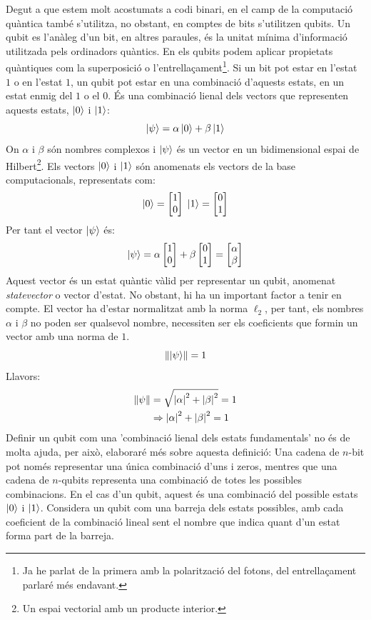 Degut a que estem molt acostumats a codi binari, en el camp de la computació quàntica també s'utilitza, no obstant, en comptes de bits s'utilitzen qubits. Un qubit es l'anàleg d'un bit, en altres paraules, és la unitat mínima d'informació utilitzada pels ordinadors quàntics. En els qubits podem aplicar propietats quàntiques com la superposició o l'entrellaçament\footnote{Ja he parlat de la primera amb la polarització del fotons, del entrellaçament parlaré més endavant.}. Si un bit pot estar en l'estat $1$ o en l'estat $1$, un qubit pot estar en una combinació d'aquests estats, en un estat enmig del $1$ o el $0$. És una combinació lienal dels vectors que representen aquests estats, $\ket{0}$ i $\ket{1}$:
$$
\ket{\psi} = \alpha\ket{0} + \beta\ket{1}
$$
On $\alpha$ i $\beta$ són nombres complexos i $\ket{\psi}$ és un vector en un bidimensional espai de Hilbert\footnote{Un espai vectorial amb un producte interior.}. Els vectors $\ket{0}$ i $\ket{1}$ són anomenats els vectors de la base computacionals, representats com:
$$
\ket{0} = \begin{bmatrix}
	1 \\ 0
\end{bmatrix} \;
\ket{1} = \begin{bmatrix}
	0 \\ 1
\end{bmatrix}
$$
Per tant el vector $\ket{\psi}$ és:
$$
\ket{\psi} 
= \alpha 
\begin{bmatrix}
	1 \\ 0
\end{bmatrix} + \beta 
\begin{bmatrix}
	0 \\ 1
\end{bmatrix}= 
\begin{bmatrix}
	\alpha \\ \beta
\end{bmatrix}
$$
Aquest vector és un estat quàntic vàlid per representar un qubit, anomenat \textit{statevector} o vector d'estat. No obstant, hi ha un important factor a tenir en compte. El vector ha d'estar normalitzat amb la norma $\ell_2$, per tant, els nombres $\alpha$ i $\beta$ no poden ser qualsevol nombre, necessiten ser els coeficients que formin un vector amb una norma de $1$.   
$$
\norm{\ket{\psi}} = 1 
$$
Llavors:
\begin{align*}
	\norm{\psi} &= \sqrt{\abs{\alpha}^2 + \abs{\beta}^2} = 1 \\
	&\Rightarrow \abs{\alpha}^2 + \abs{\beta}^2 = 1
\end{align*}
Definir un qubit com una 'combinació lienal dels estats fundamentals' no és de molta ajuda, per això, elaboraré més sobre aquesta definició: 
Una cadena de $n$-bit pot només representar una única combinació d'uns i zeros, mentres que una cadena de $n$-qubits representa una combinació de totes les possibles combinacions. En el cas d'un qubit, aquest és una combinació del possible estats $\ket{0}$ i $\ket{1}$. Considera un qubit com una barreja dels estats possibles, amb cada coeficient de la combinació lineal sent el nombre que indica quant d'un estat forma part de la barreja. 

